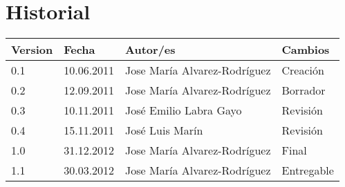 \chapter*{Historial}
\thispagestyle{empty}

\begin{tabular}{|p{1.3cm}|p{2cm}|p{7cm}|p{3cm}|}  \hline
Version & Fecha & Autor/es & Cambios \\ \hline \hline

0.1 & 10.06.2011 & Jose María Alvarez-Rodríguez & Creación  \\
0.2 & 12.09.2011 & Jose María Alvarez-Rodríguez& Borrador \\
0.3 & 10.11.2011 & José Emilio Labra Gayo & Revisión \\
0.4 & 15.11.2011 & José Luis Marín & Revisión \\
1.0 & 31.12.2012 & Jose María Alvarez-Rodríguez & Final \\
1.1 & 30.03.2012 & Jose María Alvarez-Rodríguez & Entregable \\
\hline
\end{tabular}
